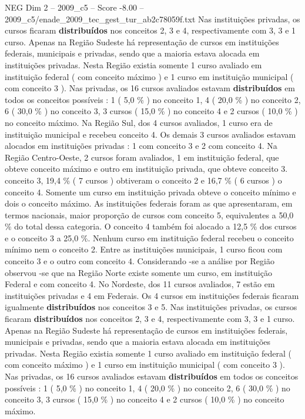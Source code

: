 \begin{textsample}{NEG Dim 2 – 2009\_c5 – Score -8.00 – 2009\_c5/enade\_2009\_tec\_gest\_tur\_ab2c78059f.txt}
Nas instituições privadas, os cursos ficaram \textbf{distribuídos} nos conceitos 2, 3 e 4, respectivamente com 3, 3 e 1 curso.
Apenas na Região Sudeste há representação de cursos em instituições federais, municipais e privadas, sendo que a maioria estava alocada em instituições privadas.
Nesta Região existia somente 1 curso avaliado em instituição federal ( com conceito máximo ) e 1 curso em instituição municipal ( com conceito 3 ).
Nas privadas, os 16 cursos avaliados estavam \textbf{distribuídos} em todos os conceitos possíveis : 1 ( 5,0 \% ) no conceito 1, 4 ( 20,0 \% ) no conceito 2, 6 ( 30,0 \% ) no conceito 3, 3 cursos ( 15,0 \% ) no conceito 4 e 2 cursos ( 10,0 \% ) no conceito máximo.
Na Região Sul, dos 4 cursos avaliados, 1 curso era de instituição municipal e recebeu conceito 4.
Os demais 3 cursos avaliados estavam alocados em instituições privadas : 1 com conceito 3 e 2 com conceito 4.
Na Região Centro-Oeste, 2 cursos foram avaliados, 1 em instituição federal, que obteve conceito máximo e outro em instituição privada, que obteve conceito 3. conceito 3, 19,4 \% ( 7 cursos ) obtiveram o conceito 2 e 16,7 \% ( 6 cursos ) o conceito 4.
Somente um curso em instituição privada obteve o conceito mínimo e dois o conceito máximo.
As instituições federais foram as que apresentaram, em termos nacionais, maior proporção de cursos com conceito 5, equivalentes a 50,0 \% do total dessa categoria.
O conceito 4 também foi alocado a 12,5 \% dos cursos e o conceito 3 a 25,0 \%.
Nenhum curso em instituição federal recebeu o conceito mínimo nem o conceito 2.
Entre as instituições municipais, 1 curso ficou com conceito 3 e o outro com conceito 4.
Considerando -se a análise por Região observou -se que na Região Norte existe somente um curso, em instituição Federal e com conceito 4.
No Nordeste, dos 11 cursos avaliados, 7 estão em instituições privadas e 4 em Federais.
Os 4 cursos em instituições federais ficaram igualmente \textbf{distribuídos} nos conceitos 3 e 5.
Nas instituições privadas, os cursos ficaram \textbf{distribuídos} nos conceitos 2, 3 e 4, respectivamente com 3, 3 e 1 curso.
Apenas na Região Sudeste há representação de cursos em instituições federais, municipais e privadas, sendo que a maioria estava alocada em instituições privadas.
Nesta Região existia somente 1 curso avaliado em instituição federal ( com conceito máximo ) e 1 curso em instituição municipal ( com conceito 3 ).
Nas privadas, os 16 cursos avaliados estavam \textbf{distribuídos} em todos os conceitos possíveis : 1 ( 5,0 \% ) no conceito 1, 4 ( 20,0 \% ) no conceito 2, 6 ( 30,0 \% ) no conceito 3, 3 cursos ( 15,0 \% ) no conceito 4 e 2 cursos ( 10,0 \% ) no conceito máximo.

\end{textsample}
